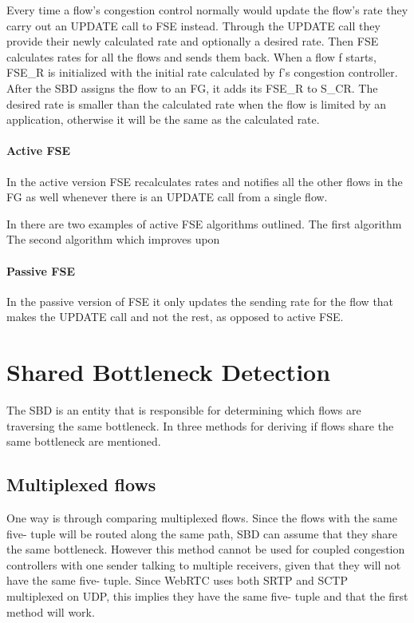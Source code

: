 \documentclass[UKenglish]{ifimaster}
\begin{document}
Every time a flow's congestion control normally would update the flow's rate they carry out an UPDATE call to FSE instead. 
Through the UPDATE call they provide their newly calculated rate and optionally a desired rate. 
Then FSE calculates rates for all the flows and sends them back. 
When a flow f starts, FSE\_R is initialized with the initial rate calculated by f's congestion controller. 
After the SBD assigns the flow to an FG, it adds its FSE\_R to S\_CR.
The desired rate is smaller than the calculated rate when the flow is limited by an application, otherwise it will be the same as the calculated rate.

\paragraph{Active FSE}
In the active version FSE recalculates rates and notifies all the other flows in the FG as well whenever there is an UPDATE call from a single flow. 


In \cite{rfc8699} there are two examples of active FSE algorithms outlined.
The first algorithm %
The second algorithm which improves upon %

\paragraph{Passive FSE}
In the passive version of FSE it only updates the sending rate for the flow that makes the UPDATE call and not the rest, as opposed to active FSE.
\section{Shared Bottleneck Detection}
The SBD is an entity that is responsible for determining which flows are traversing the same bottleneck. 
In \cite{rfc8699} three methods for deriving if flows share the same bottleneck are mentioned.
\subsection{Multiplexed flows}
One way is through comparing multiplexed flows. 
Since the flows with the same five- tuple will be routed along the same path, SBD can assume that they share the same bottleneck. 
However this method cannot be used for coupled congestion controllers with one sender talking to multiple receivers, given that they will not have the same five- tuple. 
Since WebRTC uses both SRTP and SCTP multiplexed on UDP, this implies they have the same five- tuple and that the first method will work. 
\end{document}
